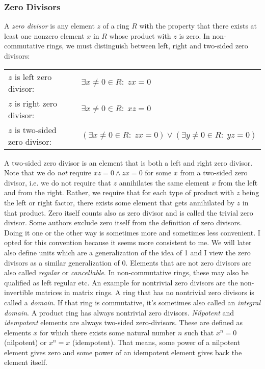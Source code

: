 \subsubsection{Zero Divisors}
A \emph{zero divisor} is any element $z$ of a ring $R$ with the property that there exists at least one nonzero element $x$ in $R$ whose product with $z$ is zero. In non-commutative rings, we must distinguish between left, right and two-sided zero divisors:

\medskip
\begin{tabular}{l l}
$z$ is left zero divisor:       & $\exists x \neq 0 \in R: \; z x = 0$  \\
$z$ is right zero divisor:      & $\exists x \neq 0 \in R: \; x z = 0$  \\
$z$ is two-sided zero divisor:  & $(\exists x \neq 0 \in R: \; z x = 0) 
                              \vee (\exists y \neq 0 \in R: \; y z = 0)$  \\
\end{tabular}
\medskip

A two-sided zero divisor is an element that is both a left and right zero divisor. Note that we do \emph{not} require $x z = 0 \wedge z x = 0$ for some $x$ from a two-sided zero divisor, i.e. we do not require that $z$ annihilates the same element $x$ from the left and from the right. Rather, we require that for each type of product with $z$ being the left or right factor, there exists some element that gets annihilated by $z$ in that product. Zero itself counts also as zero divisor and is called the trivial zero divisor. Some authors exclude zero itself from the definition of zero divisors. Doing it one or the other way is sometimes more and sometimes less convenient. I opted for this convention because it seems more consistent to me. We will later also define units which are a generalization of the idea of 1 and I view the zero divisors as a similar generalization of 0. Elements that are not zero divisors are also called \emph{regular} or \emph{cancellable}. In non-commutative rings, these may also be qualified as left regular etc. An example for nontrivial zero divisors are the non-invertible matrices in matrix rings. A ring that has no nontrivial zero divisors is called a \emph{domain}. If that ring is commutative, it's sometimes also called an \emph{integral domain}. A product ring has always nontrivial zero divisors. \emph{Nilpotent} and \emph{idempotent} elements are always two-sided zero-divisors. These are defined as elements $x$ for which there exists some natural number $n$ such that $x^n = 0$ (nilpotent) or $x^n = x$ (idempotent). That means, some power of a nilpotent element gives zero and some power of an idempotent element gives back the element itself.

